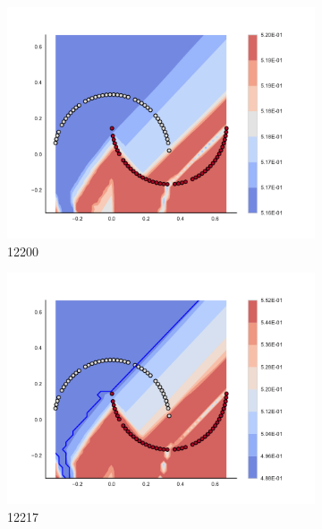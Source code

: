         \begin{figure}[h]\ContinuedFloat
        
\begin{subfigure}[b]{0.09\textwidth}
    \includegraphics[clip, trim=2.35cm 1.75cm 4.5cm 0cm,width=\textwidth]{img/convergence/12200.pdf}
    \caption{12200}
    \label{fig:convergence_12200}
\end{subfigure}
%
\begin{subfigure}[b]{0.09\textwidth}
    \includegraphics[clip, trim=2.35cm 1.75cm 4.5cm 0cm,width=\textwidth]{img/convergence/12217.pdf}
    \caption{12217}
    \label{fig:convergence_12217}
\end{subfigure}
%
\begin{subfigure}[b]{0.09\textwidth}

\end{subfigure}
\end{figure}

